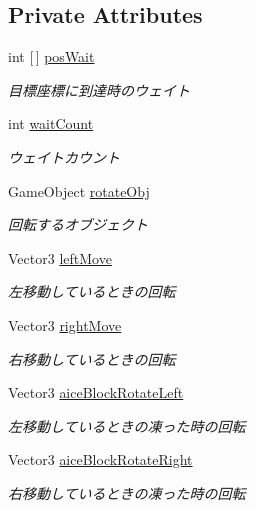 \subsection*{Private Attributes}
\begin{DoxyCompactItemize}
\item 
int \mbox{[}$\,$\mbox{]} \hyperlink{class_doragon_adb79c5d8427528e7e4bbf36c6e911ad2}{pos\+Wait}
\begin{DoxyCompactList}\small\item\em 目標座標に到達時のウェイト \end{DoxyCompactList}\item 
int \hyperlink{class_doragon_a1c12e99bbb3fa6cc68e0df213c0dd642}{wait\+Count}
\begin{DoxyCompactList}\small\item\em ウェイトカウント \end{DoxyCompactList}\item 
Game\+Object \hyperlink{class_doragon_a01a776d0cd525350c471a7a5b7cec015}{rotate\+Obj}
\begin{DoxyCompactList}\small\item\em 回転するオブジェクト \end{DoxyCompactList}\item 
Vector3 \hyperlink{class_doragon_a981bbd240522378c526222e73f1be32f}{left\+Move}
\begin{DoxyCompactList}\small\item\em 左移動しているときの回転 \end{DoxyCompactList}\item 
Vector3 \hyperlink{class_doragon_afd49bbf4f66601ee15b641d08b7f8077}{right\+Move}
\begin{DoxyCompactList}\small\item\em 右移動しているときの回転 \end{DoxyCompactList}\item 
Vector3 \hyperlink{class_doragon_aaba104d1d08e2b4a5203fa89b434623b}{aice\+Block\+Rotate\+Left}
\begin{DoxyCompactList}\small\item\em 左移動しているときの凍った時の回転 \end{DoxyCompactList}\item 
Vector3 \hyperlink{class_doragon_a4bc9a71a737302f2b6aa847ff3a6884c}{aice\+Block\+Rotate\+Right}
\begin{DoxyCompactList}\small\item\em 右移動しているときの凍った時の回転 \end{DoxyCompactList}\end{DoxyCompactItemize}

